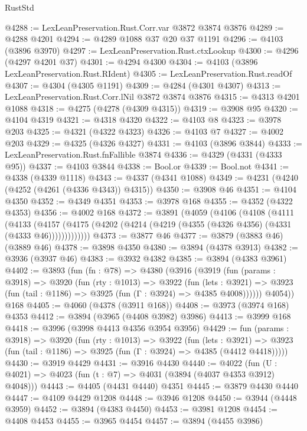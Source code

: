 \begin{lexlean}{RustStd}
\begin{coremodule}
@4288 := LexLeanPreservation.Rust.Corr.var @3872 @3874 @3876
@4289 := @4288 @4201
@4294 := @4289 @1088 @37 @20 @37 @1191
@4296 := @4103 (@3896 @3970)
@4297 := LexLeanPreservation.Rust.ctxLookup
@4300 := @4296 (@4297 @4201 @37)
@4301 := @4294 @4300
@4304 := @4103 (@3896 LexLeanPreservation.Rust.RIdent)
@4305 := LexLeanPreservation.Rust.readOf
@4307 := @4304 (@4305 @1191)
@4309 := @4284 (@4301 @4307)
@4313 := LexLeanPreservation.Rust.Corr.lNil @3872 @3874 @3876
@4315 := @4313 @4201 @1088
@4318 := @4275 (@4278 (@4309 @4315))
@4319 := @3908 @95
@4320 := @4104 @4319
@4321 := @4318 @4320
@4322 := @4103 @8
@4323 := @3978 @203
@4325 := @4321 (@4322 @4323)
@4326 := @4103 @7
@4327 := @4002 @203
@4329 := @4325 (@4326 @4327)
@4331 := @4103 (@3896 @3844)
@4333 := LexLeanPreservation.Rust.fnFallible @3874
@4336 := @4329 (@4331 (@4333 @95))
@4337 := @4103 @3844
@4338 := Bool.or
@4339 := Bool.not
@4341 := @4338 (@4339 @1118)
@4343 := @4337 (@4341 @1088)
@4349 := @4231 (@4240 (@4252 (@4261 (@4336 @4343)) @4315))
@4350 := @3908 @46
@4351 := @4104 @4350
@4352 := @4349 @4351
@4353 := @3978 @168
@4355 := @4352 (@4322 @4353)
@4356 := @4002 @168
@4372 := @3891
    (@4059
      (@4106
        (@4108
          (@4111
            (@4133
              (@4157 (@4175 (@4202 (@4214 (@4219 (@4355 (@4326 @4356) (@4331 (@4333 @46)))))))))))))
@4373 := @3877 @46
@4377 := @3879 (@3883 @46) (@3889 @46)
@4378 := @3898 @4350
@4380 := @3894 (@4378 @3913)
@4382 := @3936 (@3937 @46)
@4383 := @3932 @4382
@4385 := @3894 (@4383 @3961)
@4402 := @3893
    (fun (fn : @78) =>
    @4380
      (@3916
        (@3919
          (fun (params : @3918) =>
          @3920
            (fun (rty : @1013) =>
            @3922
              (fun (lets : @3921) =>
              @3923 (fun (tail : @1186) => @3925 (fun (Γ : @3924) => @4385 @4008))))))
        @4054))
    @168
@4405 := @4060 (@4378 (@3911 @168))
@4408 := @3973 (@3974 @168) @4353
@4412 := @3894 (@3965 (@4408 @3982) @3986)
@4413 := @3999 @168
@4418 := @3996 (@3998 @4413 @4356 @3954 @3956)
@4429 := fun (params : @3918) =>
  @3920
    (fun (rty : @1013) =>
    @3922
      (fun (lets : @3921) =>
      @3923 (fun (tail : @1186) => @3925 (fun (Γ : @3924) => @4385 (@4412 @4418)))))
@4430 := @3919 @4429
@4431 := @3916 @4430
@4440 := @4022 (fun (U : @4021) => @4023 (fun (t : @7) => @4031 (@3894 (@4037 @4353 @3912) @4048)))
@4443 := @4405 (@4431 @4440) @4351
@4445 := @3879 @4430 @4440
@4447 := @4109 @4429 @1208
@4448 := @3946 @1208
@4450 := @3944 (@4448 @3959)
@4452 := @3894 (@4383 @4450)
@4453 := @3981 @1208
@4454 := @4408 @4453
@4455 := @3965 @4454
@4457 := @3894 (@4455 @3986)

\end{coremodule}
\end{lexlean}

